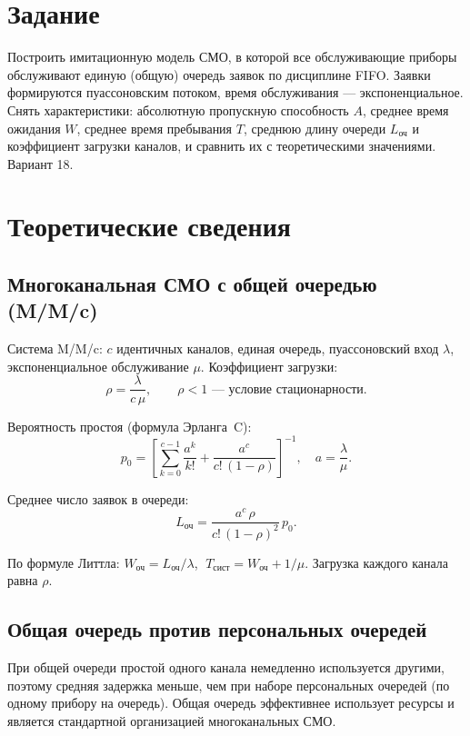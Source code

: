 \documentclass[a4paper,14pt,oneside,openany]{memoir}
\begin{document}
\section*{Задание}
Построить имитационную модель СМО, в которой все обслуживающие приборы обслуживают единую (общую) очередь заявок по дисциплине FIFO. Заявки формируются пуассоновским потоком, время обслуживания --- экспоненциальное. Снять характеристики: абсолютную пропускную способность $A$, среднее время ожидания $W$, среднее время пребывания $T$, среднюю длину очереди $L_\text{оч}$ и коэффициент загрузки каналов, и сравнить их с теоретическими значениями. Вариант 18.

\section{Теоретические сведения}

\subsection{Многоканальная СМО с общей очередью (M/M/c)}

Система M/M/c: $c$ идентичных каналов, единая очередь, пуассоновский вход $\lambda$, экспоненциальное обслуживание $\mu$. Коэффициент загрузки:
\begin{equation}
    \rho = \frac{\lambda}{c\,\mu}, \qquad \rho < 1 \text{ --- условие стационарности.}
\end{equation}

Вероятность простоя (формула Эрланга~C):
\begin{equation}
    p_0 = \left[\sum_{k=0}^{c-1}\frac{a^{k}}{k!} + \frac{a^{c}}{c!\,(1-\rho)}\right]^{-1}, \quad a=\frac{\lambda}{\mu}.
\end{equation}

Среднее число заявок в очереди:
\begin{equation}
    L_\text{оч} = \frac{a^{c}\,\rho}{c!\,(1-\rho)^{2}}\,p_0.
\end{equation}

По формуле Литтла: $W_\text{оч}=L_\text{оч}/\lambda$, $\;T_\text{сист}=W_\text{оч}+1/\mu$. Загрузка каждого канала равна $\rho$.

\subsection{Общая очередь против персональных очередей}

При общей очереди простой одного канала немедленно используется другими, поэтому средняя задержка меньше, чем при наборе персональных очередей (по одному прибору на очередь). Общая очередь эффективнее использует ресурсы и является стандартной организацией многоканальных СМО.
\end{document}
